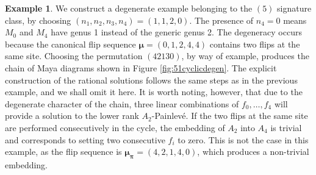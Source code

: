 \documentclass{amsart}
\theoremstyle{definition}
\newtheorem*{example}{Example} %
\newcommand{\bmu}{{\boldsymbol{\mu}}}
\newcommand{\bpi}{{\boldsymbol{\pi}}}
\begin{document}
\begin{example}
  We construct a degenerate example belonging to the $(5)$ signature
  class, by choosing $(n_1,n_2,n_3,n_4)=(1,1,2,0)$. The presence of
  $n_4=0$ means $M_0$ and $M_4$ have genus 1 instead of the generic
  genus 2.  The degeneracy occurs because the canonical flip sequence
  $\bmu=(0,1,2,4,4)$ contains two flips at the same site. Choosing the
  permutation $(42130)$, by way of example, produces the chain of Maya
  diagrams shown in Figure \ref{fig:51cyclicdegen}.  The explicit
  construction of the rational solutions follows the same steps as in
  the previous example, and we shall omit it here. It is worth noting,
  however, that due to the degenerate character of the chain, three
  linear combinations of $f_0,\dots,f_4$ will provide a solution to
  the lower rank $A_2$-Painlev\'e. If the two flips at the same site
  are performed consecutively in the cycle, the embedding of
  $A_2$ into $A_4$ is trivial and corresponds to setting
  two consecutive $f_i$ to zero. This is not the case in this example,
  as the flip sequence is $\bmu_\bpi=(4,2,1,4,0)$, which produces a
  non-trivial embedding.
\begin{figure}[ht]
  \centering
{}
\end{figure}
\end{example}
\end{document}

